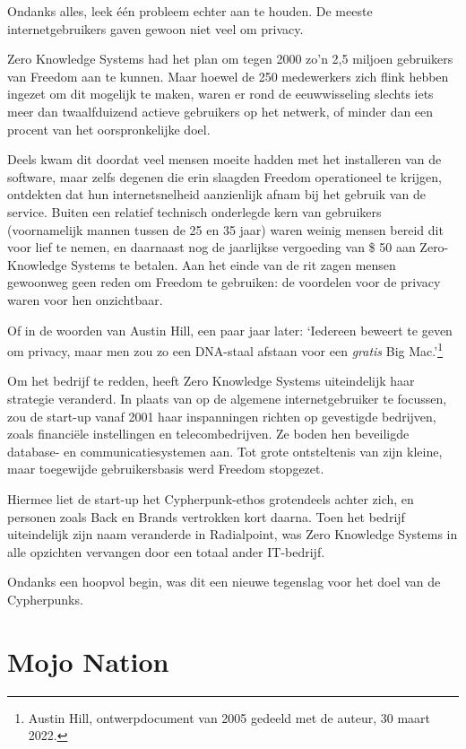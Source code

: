 \documentclass[
  a5paper,
  smalldemyvopaper,11pt,twoside,onecolumn,openright,extrafontsizes,
hidelinks]{memoir}
\begin{document}
Ondanks alles, leek één probleem echter aan te houden. De meeste
internetgebruikers gaven gewoon niet veel om privacy.

Zero Knowledge Systems had het plan om tegen 2000 zo'n 2,5 miljoen
gebruikers van Freedom aan te kunnen. Maar hoewel de 250 medewerkers
zich flink hebben ingezet om dit mogelijk te maken, waren er rond de
eeuwwisseling slechts iets meer dan twaalfduizend actieve gebruikers op
het netwerk, of minder dan een procent van het oorspronkelijke doel.

Deels kwam dit doordat veel mensen moeite hadden met het installeren van
de software, maar zelfs degenen die erin slaagden Freedom operationeel
te krijgen, ontdekten dat hun internetsnelheid aanzienlijk afnam bij het
gebruik van de service. Buiten een relatief technisch onderlegde kern
van gebruikers (voornamelijk mannen tussen de 25 en 35 jaar) waren
weinig mensen bereid dit voor lief te nemen, en daarnaast nog de
jaarlijkse vergoeding van \$ 50 aan Zero-Knowledge Systems te betalen.
Aan het einde van de rit zagen mensen gewoonweg geen reden om Freedom te
gebruiken: de voordelen voor de privacy waren voor hen onzichtbaar.

Of in de woorden van Austin Hill, een paar jaar later: `Iedereen beweert
te geven om privacy, maar men zou zo een DNA-staal afstaan voor een
\emph{gratis} Big Mac.'\footnote{Austin Hill, ontwerpdocument van 2005
  gedeeld met de auteur, 30 maart 2022.}

Om het bedrijf te redden, heeft Zero Knowledge Systems uiteindelijk haar
strategie veranderd. In plaats van op de algemene internetgebruiker te
focussen, zou de start-up vanaf 2001 haar inspanningen richten op
gevestigde bedrijven, zoals financiële instellingen en telecombedrijven.
Ze boden hen beveiligde database- en communicatiesystemen aan. Tot grote
ontsteltenis van zijn kleine, maar toegewijde gebruikersbasis werd
Freedom stopgezet.

Hiermee liet de start-up het Cypherpunk-ethos grotendeels achter zich,
en personen zoals Back en Brands vertrokken kort daarna. Toen het
bedrijf uiteindelijk zijn naam veranderde in Radialpoint, was Zero
Knowledge Systems in alle opzichten vervangen door een totaal ander
IT-bedrijf.

Ondanks een hoopvol begin, was dit een nieuwe tegenslag voor het doel
van de Cypherpunks.

\section{Mojo Nation}\label{mojo-nation}
\end{document}
